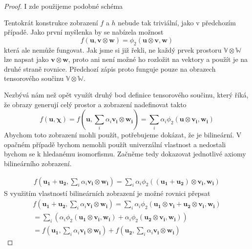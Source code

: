 \documentclass[a5paper,12pt]{amsbook}
\theoremstyle{definition}
\newcommand{\myvec}[1]{\bm{#1}}
\newcommand{\myspace}[1]{\mathbb{#1}}
\begin{document}
\begin{proof}
I zde použijeme podobné schéma
\begin{center}

\end{center}
Tentokrát konstrukce zobrazení $f$ a $h$ nebude tak triviální, jako v předchozím případě.
Jako první myšlenka by se nabízela možnost
\begin{equation*}
f(\myvec{u}, \myvec{v}\otimes\myvec{w}) = \phi_2(\myvec{u}\otimes\myvec{v}, \myvec{w})
\end{equation*}
která ale nemůže fungovat. Jak jsme si již řekli, ne každý prvek prostoru $\myspace{V}\otimes\myspace{W}$
lze napsat jako $\myvec{v}\otimes\myvec{w}$, proto ani není možné ho rozložit na vektory
a použít je na druhé straně rovnice. Předchozí zápis proto funguje pouze na obrazech
tensorového součinu $\myspace{V}\otimes\myspace{W}$.

Nezbývá nám než opět využít druhý bod definice tensorového součinu, který říká, že obrazy
generují celý prostor a zobrazení nadefinovat takto
\begin{equation*}
f(\myvec{u}, \myvec{\chi}) = f(\myvec{u}, \sum_{i}\alpha_i\myvec{v_i}\otimes\myvec{w_i}) 
  = \sum_{i}\alpha_i\phi_2(\myvec{u}\otimes\myvec{v_i}, \myvec{w_i})
\end{equation*}
Abychom toto zobrazení mohli použít, potřebujeme dokázat, že je bilineární. V opačném
případě bychom nemohli použít univerzální vlastnost a nedostali bychom se k hledanému
isomorfismu. Začněme tedy dokazovat jednotlivé axiomy bilineárního zobrazení.

\begin{equation*}
\begin{split}
f(\myvec{u_1} + \myvec{u_2}, \sum_{i}\alpha_i\myvec{v_i}\otimes\myvec{w_i})
  = \sum_{i}\alpha_i\phi_2((\myvec{u_1} + \myvec{u_2})\otimes\myvec{v_i}, \myvec{w_i})
\end{split}
\end{equation*}
S využitím vlastností bilineárních zobrazení je možné rovnici přepsat
\begin{equation*}
\begin{split}
f(\myvec{u_1} + \myvec{u_2}, \sum_{i}\alpha_i\myvec{v_i}\otimes\myvec{w_i})
= \sum_{i}\alpha_i\phi_2(\myvec{u_1}\otimes\myvec{v_i} + \myvec{u_2}\otimes\myvec{v_i}, \myvec{w_i}) \\
= \sum_{i}\left(\alpha_i\phi_2(\myvec{u_1}\otimes\myvec{v_i}, \myvec{w_i}) 
   + \alpha_i\phi_2(\myvec{u_2}\otimes\myvec{v_i}, \myvec{w_i})\right) \\
= f(\myvec{u_1}, \sum_{i}\alpha_i\myvec{v_i}\otimes\myvec{w_i}) 
   + f(\myvec{u_2}, \sum_{i}\alpha_i\myvec{v_i}\otimes\myvec{w_i})
\end{split}
\end{equation*}


\end{proof}
\end{document}
